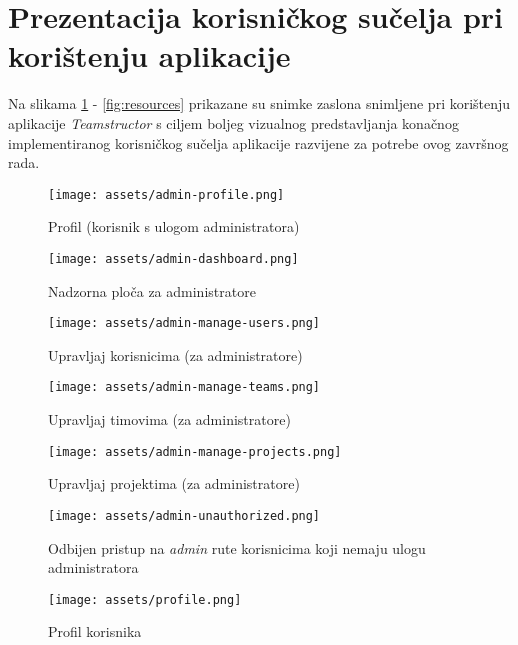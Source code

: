 \section{Prezentacija korisničkog sučelja pri korištenju aplikacije}
Na slikama \ref{fig:adminProfile} - \ref{fig:resources} prikazane su snimke zaslona snimljene pri korištenju aplikacije \textit{Teamstructor} s ciljem boljeg vizualnog predstavljanja konačnog implementiranog korisničkog sučelja aplikacije razvijene za potrebe ovog završnog rada.

\begin{figure}[H]
	\texttt{[image: assets/admin-profile.png]}
	\centering
	\caption{Profil (korisnik s ulogom administratora)}
	\label{fig:adminProfile}
\end{figure}

\begin{figure}[H]
	\texttt{[image: assets/admin-dashboard.png]}
	\centering
	\caption{Nadzorna ploča za administratore}	\label{fig:adminDashboard}
\end{figure}

\begin{figure}[H]
	\texttt{[image: assets/admin-manage-users.png]}
	\centering
	\caption{Upravljaj korisnicima (za administratore)}
	\label{fig:manageUsers}
\end{figure}

\begin{figure}[H]
	\texttt{[image: assets/admin-manage-teams.png]}
	\centering
	\caption{Upravljaj timovima (za administratore)}
	\label{fig:manageTeams}
\end{figure}

\begin{figure}[H]
	\texttt{[image: assets/admin-manage-projects.png]}
	\centering
	\caption{Upravljaj projektima (za administratore)}
	\label{fig:manageProjects}
\end{figure}

\begin{figure}[H]
	\texttt{[image: assets/admin-unauthorized.png]}
	\centering
	\caption{Odbijen pristup na \textit{admin} rute korisnicima koji nemaju ulogu administratora}
	\label{fig:adminUnauthorized}
\end{figure}

\begin{figure}[H]
	\texttt{[image: assets/profile.png]}
	\centering
	\caption{Profil korisnika}
	\label{fig:profile}
\end{figure}

